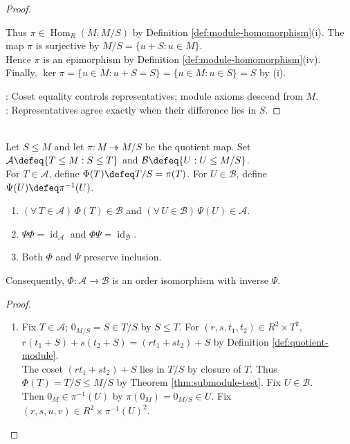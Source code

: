 \begin{proposition}
\begin{proof}
\begin{enumerate}[label=(\roman*)]
Thus $\pi\in\operatorname{Hom}_R(M,M/S)$ by Definition \ref{def:module-homomorphism}(i). The map $\pi$ is surjective by $M/S=\{u+S:u\in M\}$.\\
Hence $\pi$ is an epimorphism by Definition \ref{def:module-homomorphism}(iv). Finally, $\ker\pi=\{u\in M:u+S=S\}=\{u\in M:u\in S\}=S$ by (i).
\end{enumerate}
: Coset equality controls representatives; module axioms descend from $M$.\\
: Representatives agree exactly when their difference lies in $S$.
\end{proof}
\end{proposition}

\begin{theorem} \label{thm:module-correspondence-theorem} \\
Let $S\leq M$ and let $\pi:M\twoheadrightarrow M/S$ be the quotient map. Set $\mathcal{A}\defeq\{T\leq M:S\leq T\}$ and $\mathcal{B}\defeq\{U:U\leq M/S\}$.\\
For $T\in\mathcal{A}$, define $\Phi(T)\defeq T/S=\pi(T)$. For $U\in\mathcal{B}$, define $\Psi(U)\defeq\pi^{-1}(U)$.
\begin{enumerate}[label=(\roman*)]
\setlength{\itemsep}{0pt}
\item $(\forall\,T\in\mathcal{A})\,\Phi(T)\in\mathcal{B}$ and $(\forall\,U\in\mathcal{B})\,\Psi(U)\in\mathcal{A}$.
\item $\Psi\Phi=\operatorname{id}_{\mathcal{A}}$ and $\Phi\Psi=\operatorname{id}_{\mathcal{B}}$.
\item Both $\Phi$ and $\Psi$ preserve inclusion.
\end{enumerate}
Consequently, $\Phi:\mathcal{A}\to\mathcal{B}$ is an order isomorphism with inverse $\Psi$.
\begin{proof}
\begin{enumerate}[label=(\roman*)]
\setlength{\itemsep}{0pt}
\item Fix $T\in\mathcal{A}$; $0_{M/S}=S\in T/S$ by $S\leq T$. For $(r,s,t_1,t_2)\in R^2\times T^2$, $r(t_1+S)+s(t_2+S)=(rt_1+st_2)+S$ by Definition \ref{def:quotient-module}.\\
The coset $(rt_1+st_2)+S$ lies in $T/S$ by closure of $T$. Thus $\Phi(T)=T/S\leq M/S$ by Theorem \ref{thm:submodule-test}. Fix $U\in\mathcal{B}$.\\
Then $0_M\in\pi^{-1}(U)$ by $\pi(0_M)=0_{M/S}\in U$. Fix $(r,s,u,v)\in R^2\times\pi^{-1}(U)^2$.\\

\end{enumerate}
\end{proof}
\end{theorem}
